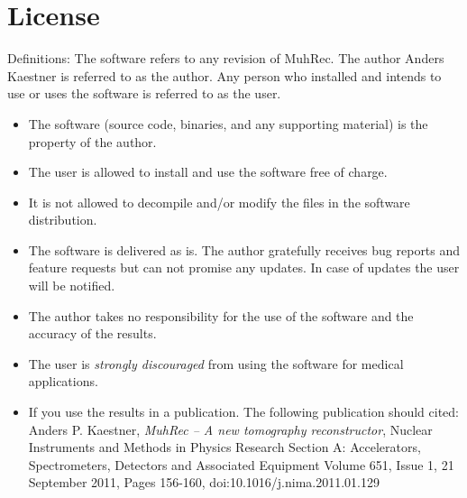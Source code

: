\documentclass[a4paper]{scrreprt}
\begin{document}


\appendix
\chapter{License}
Definitions: The software refers to any revision of MuhRec. The author Anders
Kaestner is referred to as the author. Any person who installed and intends to
use or uses the software is referred to as the user.
\begin{itemize}
\item The software (source code, binaries, and any supporting material) is the property of the author.
\item The user is allowed to install and use the software free of charge.
\item It is not allowed to decompile and/or modify the files in the software distribution.
\item The software is delivered as is. The author gratefully receives bug
reports and feature requests but can not promise any updates. In case of updates
the user will be notified.
\item The author takes no responsibility for the use of the software and the
accuracy of the results.
\item The user is \emph{strongly discouraged} from using the software for
medical applications.
\item If you use the results in a publication. The following publication should
cited: Anders P. Kaestner, \emph{MuhRec -- A new tomography reconstructor},
Nuclear Instruments and Methods in Physics Research Section A:
Accelerators, Spectrometers, Detectors and Associated Equipment
Volume 651, Issue 1, 21 September 2011, Pages 156-160,
doi:10.1016/j.nima.2011.01.129

\end{itemize}
\end{document}
